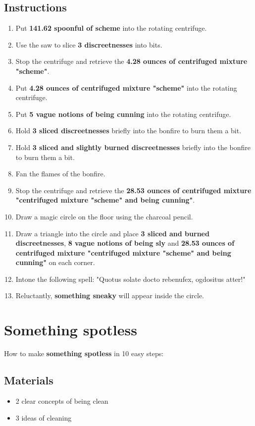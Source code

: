 \documentclass{article}
\begin{document}
\subsection{Instructions}\begin{enumerate}
\item 
Put \textbf{141.62 spoonful of scheme} into the rotating centrifuge.
\item 
Use the saw to slice \textbf{3 discreetnesses} into bits.
\item 
Stop the centrifuge and retrieve the \textbf{4.28 ounces of centrifuged mixture "scheme"}.
\item 
Put \textbf{4.28 ounces of centrifuged mixture "scheme"} into the rotating centrifuge.
\item 
Put \textbf{5 vague notions of being cunning} into the rotating centrifuge.
\item 
Hold \textbf{3 sliced discreetnesses} briefly into the bonfire to burn them a bit.
\item 
Hold \textbf{3 sliced and slightly burned discreetnesses} briefly into the bonfire to burn them a bit.
\item 
Fan the flames of the bonfire.
\item 
Stop the centrifuge and retrieve the \textbf{28.53 ounces of centrifuged mixture "centrifuged mixture "scheme" and being cunning"}.
\item 
Draw a magic circle on the floor using the charcoal pencil.
\item 
Draw a triangle into the circle and place \textbf{3 sliced and burned discreetnesses}, \textbf{8 vague notions of being sly} and \textbf{28.53 ounces of centrifuged mixture "centrifuged mixture "scheme" and being cunning"} on each corner.
\item 
Intone the following spell: "Quotus solate docto rebenufex, ogdositus atter!"
\item 
Reluctantly, \textbf{something sneaky} will appear inside the circle.
\end{enumerate}
\newpage
\section{Something spotless}How to make \textbf{something spotless} in 10 easy steps:

\subsection{Materials}\begin{itemize}
\item 
2 clear concepts of being clean
\item 
3 ideas of cleaning
\end{itemize}
\end{document}
